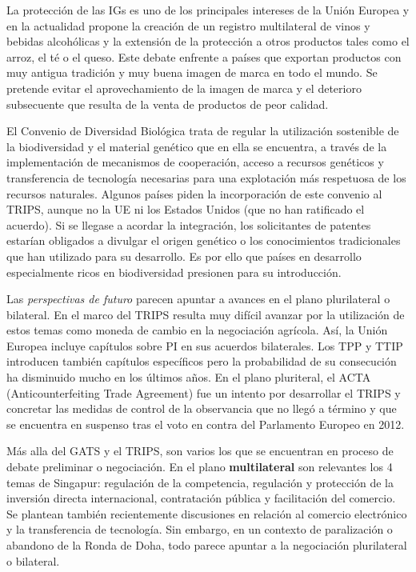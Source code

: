 \documentclass{nuevotema}
\begin{document}
La protección de las IGs es uno de los principales intereses de la Unión Europea y en la actualidad propone la creación de un registro multilateral de vinos y bebidas alcohólicas y la extensión de la protección a otros productos tales como el arroz, el té o el queso. Este debate enfrente a países que exportan productos con muy antigua tradición y muy buena imagen de marca en todo el mundo. Se pretende evitar el aprovechamiento de la imagen de marca y el deterioro subsecuente que resulta de la venta de productos de peor calidad.

El Convenio de Diversidad Biológica trata de regular la utilización sostenible de la biodiversidad y el material genético que en ella se encuentra, a través de la implementación de mecanismos de cooperación, acceso a recursos genéticos y transferencia de tecnología necesarias para una explotación más respetuosa de los recursos naturales. Algunos países piden la incorporación de este convenio al TRIPS, aunque no la UE ni los Estados Unidos (que no han ratificado el acuerdo). Si se llegase a acordar la integración, los solicitantes de patentes estarían obligados a divulgar el origen genético o los conocimientos tradicionales que han utilizado para su desarrollo. Es por ello que países en desarrollo especialmente ricos en biodiversidad presionen para su introducción.

Las \textit{perspectivas de futuro} parecen apuntar a avances en el plano plurilateral o bilateral. En el marco del TRIPS resulta muy difícil avanzar por la utilización de estos temas como moneda de cambio en la negociación agrícola. Así, la Unión Europea incluye capítulos sobre PI en sus acuerdos bilaterales. Los TPP y TTIP introducen también capítulos específicos pero la probabilidad de su consecución ha disminuido mucho en los últimos años. En el plano pluriteral, el ACTA (Anticounterfeiting Trade Agreement) fue un intento por desarrollar el TRIPS y concretar las medidas de control de la observancia que no llegó a término y que se encuentra en suspenso tras el voto en contra del Parlamento Europeo en 2012.

Más alla del GATS y el TRIPS, son varios los  que se encuentran en proceso de debate preliminar o negociación. En el plano \textbf{multilateral} son relevantes los 4 temas de Singapur: regulación de la competencia, regulación y protección de la inversión directa internacional, contratación pública y facilitación del comercio. Se plantean también recientemente discusiones en relación al comercio electrónico y la transferencia de tecnología. Sin embargo, en un contexto de paralización o abandono de la Ronda de Doha, todo parece apuntar a la negociación plurilateral o bilateral.
\end{document}
